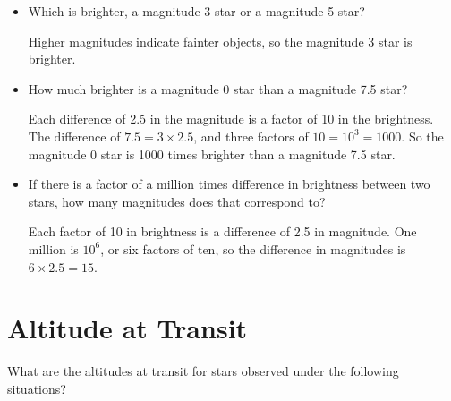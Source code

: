 \documentclass[12pt, preprint]{aastex}
\begin{document}
\begin{itemize}
\item Which is brighter, a magnitude 3 star or a magnitude 5 star?

  \begin{answer}
    Higher magnitudes indicate fainter objects, so the magnitude 3
    star is brighter.
  \end{answer}

\item How much brighter is a magnitude 0 star than a magnitude 7.5
  star?

  \begin{answer}
    Each difference of 2.5 in the magnitude is a factor of 10 in the
    brightness. The difference of $7.5 = 3\times 2.5$, and three
    factors of $10 = 10^3 = 1000$. So the magnitude 0 star is 1000
    times brighter than a magnitude 7.5 star.
  \end{answer}

\item If there is a factor of a million times difference in
  brightness between two stars, how many magnitudes does that
  correspond to?

  \begin{answer}
    Each factor of 10 in brightness is a difference of 2.5 in
    magnitude. One million is $10^6$, or six factors of ten, so the
    difference in magnitudes is $6\times 2.5 = 15$.
  \end{answer}

\end{itemize}

\section{Altitude at Transit}

What are the altitudes at transit for stars observed under the
following situations?
\end{document}
